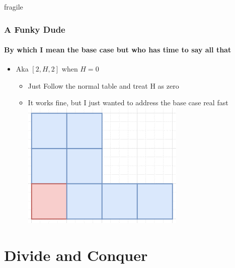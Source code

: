 \documentclass[aspectratio=169,usenames,dvipsnames]{beamer}
\begin{document}
\begin{frame}{fragile}
    \frametitle{A Funky Dude}
    \framesubtitle{By which I mean the base case but who has time to say all that}
    
    \begin{itemize}
        \item Aka $[2, H, 2]$ when $H = 0$
        \begin{itemize}
            \item Just Follow the normal table and treat H as zero
            \item It works fine, but I just wanted to address the base case real fast\\
            \includegraphics[scale=0.4]{funkydude.png}
        \end{itemize}
    \end{itemize}
    
\end{frame}

\section{Divide and Conquer}
\end{document}
